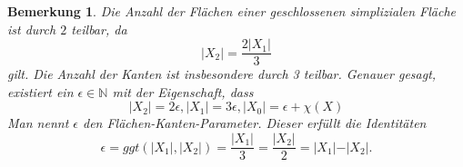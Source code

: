 \documentclass[12pt,titlepage,twoside,cleardoublepage]{article}
\theoremstyle{nummermitklammern}
\newtheorem{lemma}[temp]{Lemma}
\newtheorem{bemerkung}[temp]{Bemerkung}
\newtheorem{lemma}[zahl]{Lemma}
\newtheorem{bemerkung}[zahl]{Bemerkung}
\numberwithin{equation}{section}
\begin{document}
\begin{bemerkung}
Die Anzahl der Flächen einer geschlossenen simplizialen Fläche ist durch $2$ teilbar, da
\[
\vert X_{2} \vert = \frac{2\vert X_{1}\vert}{3}
\]
gilt.
Die Anzahl der Kanten ist insbesondere durch 3 teilbar. 
Genauer gesagt, existiert ein $\epsilon \in \mathbb{N}$ mit der Eigenschaft, dass
\[
\vert X_2 \vert=2\epsilon,
\vert X_1 \vert=3\epsilon,
\vert X_0 \vert=\epsilon+\chi(X)
\]
Man nennt $\epsilon$ den Flächen-Kanten-Parameter. Dieser erfüllt die Identitäten
\[
\epsilon=ggt(\vert X_1\vert,\vert X_2\vert)=\frac{\vert X_1\vert}{3}=\frac{\vert X_2\vert}{2}=\vert X_1\vert-\vert X_2\vert .
\] 
\end{bemerkung}





\end{document}
